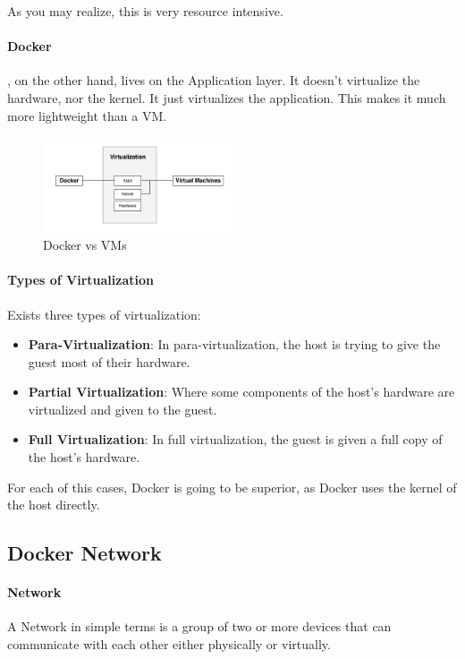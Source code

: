 \documentclass[a4paper]{article}
\begin{document}
    As you may realize, this is very resource intensive.

    \paragraph*{Docker}, on the other hand, lives on the Application layer. It doesn't virtualize the hardware, nor the kernel. It just virtualizes the application. This makes it much more lightweight than a VM.


    \begin{figure}[h]
        \centering
        \includegraphics[width=0.5\textwidth]{img/docker-vs-vms.png}
        \caption{Docker vs VMs}
        \label{fig:my_label}
    \end{figure}

    \paragraph{Types of Virtualization} Exists three types of virtualization:
    \begin{itemize}
        \item \textbf{Para-Virtualization}: In para-virtualization, the host is trying to give the guest most of their hardware. 
        \item \textbf{Partial Virtualization}: Where some components of the host's hardware are virtualized and given to the guest.
        \item \textbf{Full Virtualization}: In full virtualization, the guest is given a full copy of the host's hardware.
    \end{itemize}

    For each of this cases, Docker is going to be superior, as Docker uses the kernel of the host directly.

    \subsection{Docker Network}

    \paragraph{Network} A Network in simple terms is a group of two or more devices that can communicate with each other either physically or virtually.
\end{document}
